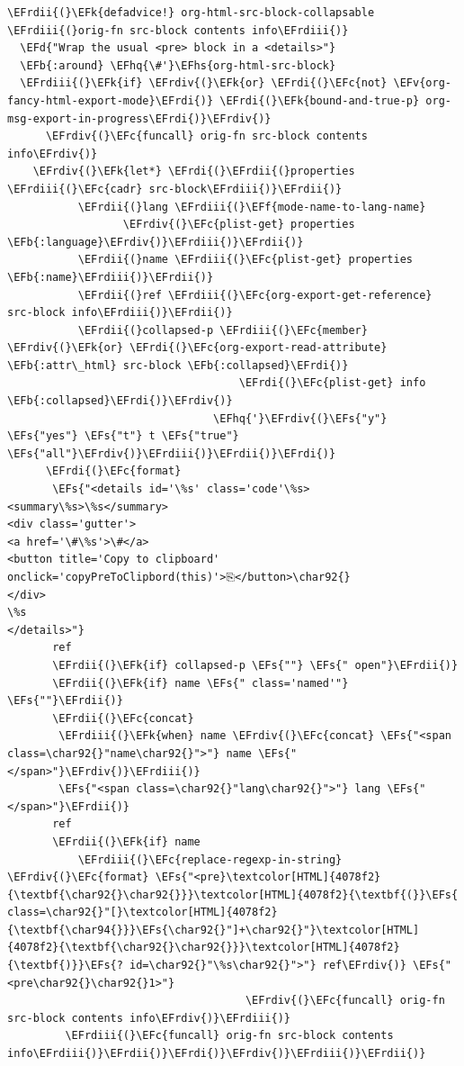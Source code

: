 \documentclass{scrartcl}
\newcommand{\EFk}[1]{\textcolor{EFk}{#1}} %
\newcommand{\EFd}[1]{\textcolor{EFd}{\textit{#1}}} %
\newcommand{\EFs}[1]{\textcolor{EFs}{#1}} %
\newcommand{\EFb}[1]{\textcolor{EFb}{#1}} %
\newcommand{\EFc}[1]{\textcolor{EFc}{#1}} %
\newcommand{\EFv}[1]{\textcolor{EFv}{#1}} %
\newcommand{\EFf}[1]{\textcolor{EFf}{#1}} %
\newcommand{\EFhq}[1]{\textcolor{EFhq}{#1}} %
\newcommand{\EFhs}[1]{\textcolor{EFhs}{#1}} %
\newcommand{\EFrdi}[1]{\textcolor{EFrdi}{#1}} %
\newcommand{\EFrdii}[1]{\textcolor{EFrdii}{#1}} %
\newcommand{\EFrdiii}[1]{\textcolor{EFrdiii}{#1}} %
\newcommand{\EFrdiv}[1]{\textcolor{EFrdiv}{#1}} %
\begin{document}
\begin{Code}
\begin{Verbatim}[]
\EFrdii{(}\EFk{defadvice!} org-html-src-block-collapsable \EFrdiii{(}orig-fn src-block contents info\EFrdiii{)}
  \EFd{"Wrap the usual <pre> block in a <details>"}
  \EFb{:around} \EFhq{\#'}\EFhs{org-html-src-block}
  \EFrdiii{(}\EFk{if} \EFrdiv{(}\EFk{or} \EFrdi{(}\EFc{not} \EFv{org-fancy-html-export-mode}\EFrdi{)} \EFrdi{(}\EFk{bound-and-true-p} org-msg-export-in-progress\EFrdi{)}\EFrdiv{)}
      \EFrdiv{(}\EFc{funcall} orig-fn src-block contents info\EFrdiv{)}
    \EFrdiv{(}\EFk{let*} \EFrdi{(}\EFrdii{(}properties \EFrdiii{(}\EFc{cadr} src-block\EFrdiii{)}\EFrdii{)}
           \EFrdii{(}lang \EFrdiii{(}\EFf{mode-name-to-lang-name}
                  \EFrdiv{(}\EFc{plist-get} properties \EFb{:language}\EFrdiv{)}\EFrdiii{)}\EFrdii{)}
           \EFrdii{(}name \EFrdiii{(}\EFc{plist-get} properties \EFb{:name}\EFrdiii{)}\EFrdii{)}
           \EFrdii{(}ref \EFrdiii{(}\EFc{org-export-get-reference} src-block info\EFrdiii{)}\EFrdii{)}
           \EFrdii{(}collapsed-p \EFrdiii{(}\EFc{member} \EFrdiv{(}\EFk{or} \EFrdi{(}\EFc{org-export-read-attribute} \EFb{:attr\_html} src-block \EFb{:collapsed}\EFrdi{)}
                                    \EFrdi{(}\EFc{plist-get} info \EFb{:collapsed}\EFrdi{)}\EFrdiv{)}
                                \EFhq{'}\EFrdiv{(}\EFs{"y"} \EFs{"yes"} \EFs{"t"} t \EFs{"true"} \EFs{"all"}\EFrdiv{)}\EFrdiii{)}\EFrdii{)}\EFrdi{)}
      \EFrdi{(}\EFc{format}
       \EFs{"<details id='\%s' class='code'\%s><summary\%s>\%s</summary>
<div class='gutter'>
<a href='\#\%s'>\#</a>
<button title='Copy to clipboard' onclick='copyPreToClipbord(this)'>⎘</button>\char92{}
</div>
\%s
</details>"}
       ref
       \EFrdii{(}\EFk{if} collapsed-p \EFs{""} \EFs{" open"}\EFrdii{)}
       \EFrdii{(}\EFk{if} name \EFs{" class='named'"} \EFs{""}\EFrdii{)}
       \EFrdii{(}\EFc{concat}
        \EFrdiii{(}\EFk{when} name \EFrdiv{(}\EFc{concat} \EFs{"<span class=\char92{}"name\char92{}">"} name \EFs{"</span>"}\EFrdiv{)}\EFrdiii{)}
        \EFs{"<span class=\char92{}"lang\char92{}">"} lang \EFs{"</span>"}\EFrdii{)}
       ref
       \EFrdii{(}\EFk{if} name
           \EFrdiii{(}\EFc{replace-regexp-in-string} \EFrdiv{(}\EFc{format} \EFs{"<pre}\textcolor[HTML]{4078f2}{\textbf{\char92{}\char92{}}}\textcolor[HTML]{4078f2}{\textbf{(}}\EFs{ class=\char92{}"[}\textcolor[HTML]{4078f2}{\textbf{\char94{}}}\EFs{\char92{}"]+\char92{}"}\textcolor[HTML]{4078f2}{\textbf{\char92{}\char92{}}}\textcolor[HTML]{4078f2}{\textbf{)}}\EFs{? id=\char92{}"\%s\char92{}">"} ref\EFrdiv{)} \EFs{"<pre\char92{}\char92{}1>"}
                                     \EFrdiv{(}\EFc{funcall} orig-fn src-block contents info\EFrdiv{)}\EFrdiii{)}
         \EFrdiii{(}\EFc{funcall} orig-fn src-block contents info\EFrdiii{)}\EFrdii{)}\EFrdi{)}\EFrdiv{)}\EFrdiii{)}\EFrdii{)}


\end{Verbatim}
\end{Code}
\end{document}
